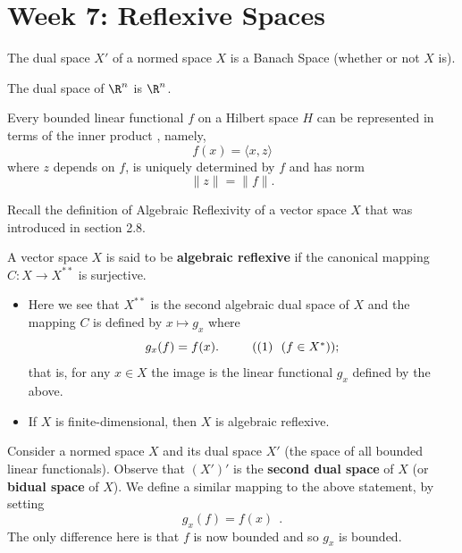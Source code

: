 \section{Week 7: Reflexive Spaces}

\begin{theorem}\label{2.10-4}
   The dual space \( X' \) of a normed space \( X  \) is a Banach Space (whether or not \( X  \) is). 
\end{theorem}

\begin{prop}[ ]
   The dual space of \( \R^{n} \) is \( \R^{n} \).
\end{prop}

\begin{theorem}[3.8-1]\label{Riesz Representation}
    Every bounded linear functional \( f  \) on a Hilbert space \( H  \) can be represented in terms of the inner product , namely, 
    \[  f(x) = \langle x  ,  z  \rangle \]
    where \( z  \) depends on \( f  \), is uniquely determined by \( f  \) and has norm
    \[  \|z \| = \|f \|. \]
\end{theorem}

Recall the definition of Algebraic Reflexivity of a vector space \( X  \) that was introduced in section 2.8.

\begin{definition}
   A vector space \( X  \) is said to be \textbf{algebraic reflexive} if the canonical mapping \( C : X \to X^{**} \) is surjective. 
\end{definition}

\begin{itemize}
    \item Here we see that \( X^{**} \) is the second algebraic dual space of \( X  \) and the mapping \( C  \) is defined by \( x \mapsto {g}_{x} \) where 
        \[  {g}_{x}(f) = f(x). \ \  \tag{(1) \ \( (f \in X^{*}) \)}; \]
        that is, for any \( x \in X  \) the image is the linear functional \( {g}_{x} \) defined by the above.
    \item If \( X  \) is finite-dimensional, then \( X  \) is algebraic reflexive.
\end{itemize}

Consider a normed space \( X  \) and its dual space \( X' \) (the space of all bounded linear functionals). Observe that \( (X')' \) is the \textbf{second dual space} of \( X  \) (or \textbf{bidual space} of \( X  \)). We define a similar mapping to the above statement, by setting
\[  {g}_{x}(f) = f(x) \ \ \tag{(2), \ \( (f \in X') \)}. \]
The only difference here is that \( f  \) is now bounded and so \( {g}_{x}  \) is bounded. 

